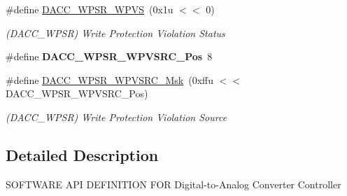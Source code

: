 \begin{DoxyCompactItemize}
\mbox{\label{group__SAMS70__DACC_ga5ae2d17379a2528900c8084440ee66a3}} 
\#define \mbox{\hyperlink{group__SAMS70__DACC_ga5ae2d17379a2528900c8084440ee66a3}{D\+A\+C\+C\+\_\+\+W\+P\+S\+R\+\_\+\+W\+P\+VS}}~(0x1u $<$$<$ 0)
\begin{DoxyCompactList}\small\item\em (D\+A\+C\+C\+\_\+\+W\+P\+SR) Write Protection Violation Status \end{DoxyCompactList}\item 
\mbox{\label{group__SAMS70__DACC_ga4ef4dcc3bf2e023b9638d70b2c13e727}} 
\#define {\bfseries D\+A\+C\+C\+\_\+\+W\+P\+S\+R\+\_\+\+W\+P\+V\+S\+R\+C\+\_\+\+Pos}~8
\item 
\mbox{\label{group__SAMS70__DACC_gaec9589b916ff63d79b578e7b3d8f2af9}} 
\#define \mbox{\hyperlink{group__SAMS70__DACC_gaec9589b916ff63d79b578e7b3d8f2af9}{D\+A\+C\+C\+\_\+\+W\+P\+S\+R\+\_\+\+W\+P\+V\+S\+R\+C\+\_\+\+Msk}}~(0xffu $<$$<$ D\+A\+C\+C\+\_\+\+W\+P\+S\+R\+\_\+\+W\+P\+V\+S\+R\+C\+\_\+\+Pos)
\begin{DoxyCompactList}\small\item\em (D\+A\+C\+C\+\_\+\+W\+P\+SR) Write Protection Violation Source \end{DoxyCompactList}\end{DoxyCompactItemize}


\subsection{Detailed Description}
S\+O\+F\+T\+W\+A\+RE A\+PI D\+E\+F\+I\+N\+I\+T\+I\+ON F\+OR Digital-\/to-\/\+Analog Converter Controller 